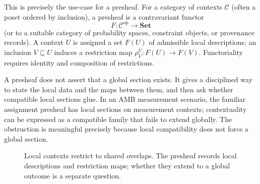 \documentclass[11pt]{article}
\newcommand{\Ctx}{\mathcal{C}}
\begin{document}
This is precisely the use-case for a presheaf. For a category of contexts $\Ctx$ (often a poset ordered by inclusion), a presheaf is a contravariant functor
\[
  F:\Ctx^{\mathrm{op}}\longrightarrow\mathbf{Set}
\]
(or to a suitable category of probability spaces, constraint objects, or provenance records). A context $U$ is assigned a set $F(U)$ of admissible local descriptions; an inclusion $V\subseteq U$ induces a restriction map $\rho^U_V:F(U)\to F(V)$. Functoriality requires identity and composition of restrictions.

A presheaf does not assert that a global section exists. It gives a disciplined way to state the local data and the maps between them, and then ask whether compatible local sections glue. In an AMB measurement scenario, the familiar assignment presheaf has local sections on measurement contexts; contextuality can be expressed as a compatible family that fails to extend globally. The obstruction is meaningful precisely because local compatibility does not force a global section.

\begin{figure}[ht]
\centering
{}
\caption{Local contexts restrict to shared overlaps. The presheaf records local descriptions and restriction maps; whether they extend to a global outcome is a separate question.}
\label{fig:presheaf}
\end{figure}
\end{document}
